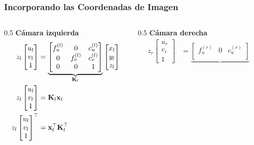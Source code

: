 \begin{frame}
    \frametitle{Incorporando las Coordenadas de Imagen}
    \begin{columns}[T]
        \begin{column}{0.5\textwidth}
            \centering
            \textbf{Cámara izquierda}
            \begin{align*}
                z_l \begin{bmatrix} u_l \\ v_l \\ 1 \end{bmatrix} &=
                \underbrace{\begin{bmatrix}
                    f_u^{(l)} & 0 & c_u^{(l)} \\
                    0 & f_v^{(l)} & c_v^{(l)} \\
                    0 & 0 & 1
                \end{bmatrix}}_{\boldsymbol{\mathbf{K}}_{l}}\begin{bmatrix} x_l \\ y_l \\ z_l \end{bmatrix}\\
                z_{l} \begin{bmatrix} u_l \\ v_l \\ 1 \end{bmatrix} &= \boldsymbol{\mathbf{K}}_{l} \boldsymbol{\mathbf{x}}_{l}\\
                z_{l} \begin{bmatrix} u_l \\ v_l \\ 1 \end{bmatrix}^{\top} &= \boldsymbol{\mathbf{x}}_{l}^{\top} \boldsymbol{\mathbf{K}}_{l}^{\top}
            \end{align*}
        \end{column}
        \begin{column}{0.5\textwidth}
            \centering
            \textbf{Cámara derecha}
            \begin{align*}
                z_r \begin{bmatrix} u_r \\ v_r \\ 1 \end{bmatrix} &=
                \underbrace{\begin{bmatrix}
                    f_u^{(r)} & 0 & c_u^{(r)} \\

\end{bmatrix}}
\end{align*}
\end{column}
\end{columns}
\end{frame}
